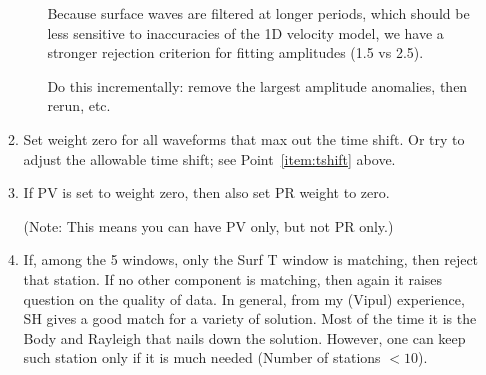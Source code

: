 \begin{enumerate}
\begin{enumerate}
\begin{enumerate}
\begin{itemize}
\end{itemize}

Because surface waves are filtered at longer periods, which should be less sensitive to inaccuracies of the 1D velocity model, we have a stronger rejection criterion for fitting amplitudes (1.5 vs 2.5).

Do this incrementally: remove the largest amplitude anomalies, then rerun, etc.

\end{enumerate}

\item Set weight zero for all waveforms that max out the time shift. Or try to adjust the allowable time shift; see Point~\ref{item:tshift} above.


\item If PV is set to weight zero, then also set PR weight to zero.

(Note: This means you can have PV only, but not PR only.)





\item If, among the 5 windows, only the Surf T window is matching, then reject that station. If no other component is matching, then again it raises question on the quality of data. In general, from my (Vipul) experience, SH gives a good match for a variety of solution. Most of the time it is the Body and Rayleigh that nails down the solution. However, one can keep such station only if it is much needed (Number of stations $< 10$).


\end{enumerate}
\end{enumerate}
